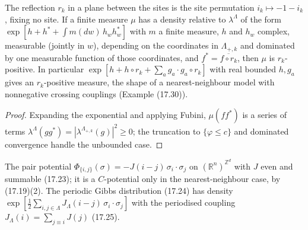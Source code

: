 \begin{lemma}[Georgii (17.26)]
    \label{lem:rp-17-26}
    \leanok

    The reflection $r_k$ in a plane between the sites is the site permutation $i_k \mapsto
    -1 - i_k$, fixing no site. If a finite measure $\mu$ has a density relative to
    $\lambda^\Lambda$ of the form $\exp[h + h^* + \int m(dw)\, h_w h_w^*]$ with $m$ a finite
    measure, $h$ and $h_w$ complex, measurable (jointly in $w$), depending on the coordinates in
    $\Lambda_{+,k}$ and dominated by one measurable function of those coordinates, and
    $f^* = \overline{f \circ r_k}$, then $\mu$ is $r_k$-positive. In particular
    $\exp[h + h\circ r_k + \sum_a g_a \cdot g_a \circ r_k]$ with real bounded $h, g_a$ gives an
    $r_k$-positive measure, the shape of a nearest-neighbour model with nonnegative crossing
    couplings (Example (17.30)).
\end{lemma}
\begin{proof}
    \leanok
    Expanding the exponential and applying Fubini, $\mu(ff^*)$ is a series of terms
    $\lambda^\Lambda(gg^*) = |\lambda^{\Lambda_{+,k}}(g)|^2 \geq 0$; the truncation to
    $\{\varphi \leq c\}$ and dominated convergence handle the unbounded case.
\end{proof}

\begin{definition}
    \label{def:rp-17-22}
    \leanok

    The pair potential $\Phi_{\{i,j\}}(\sigma) = -J(i-j)\,\sigma_i\cdot\sigma_j$ on
    $(\mathbb R^n)^{\mathbb Z^d}$ with $J$ even and summable (17.23); it is a $C$-potential only in
    the nearest-neighbour case, by (17.19)(2). The periodic Gibbs distribution (17.24) has density
    $\exp[\tfrac12\sum_{i,j\in\Lambda} J_\Lambda(i-j)\,\sigma_i\cdot\sigma_j]$ with the periodised
    coupling $J_\Lambda(i) = \sum_{j \equiv i} J(j)$ (17.25).
\end{definition}


